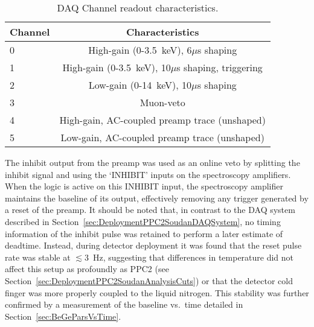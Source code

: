 	\begin{table}
		\centering
		\begin{tabular}{l c}
			\toprule
			Channel & Characteristics \\
			\midrule
			0 & High-gain (0-3.5~keV), 6$\mu$s shaping \\
			1 & High-gain (0-3.5~keV), 10$\mu$s shaping, triggering \\
			2 & Low-gain (0-14~keV), 10$\mu$s shaping \\
			3 & Muon-veto \\
			4 & High-gain, AC-coupled preamp trace (unshaped) \\
			5 & Low-gain, AC-coupled preamp trace (unshaped) \\
			\bottomrule
		\end{tabular}
		\caption[DAQ Channel readout characteristics]
		{DAQ Channel readout characteristics. }
		\label{tab:SoudanDAQTable}
	\end{table}

The inhibit output from the preamp was used as an online veto by splitting the inhibit signal and using the `INHIBIT' inputs on the spectroscopy amplifiers.  When the logic is active on this INHIBIT input, the spectroscopy amplifier maintains the baseline of its output, effectively removing any trigger generated by a reset of the preamp.  It should be noted that, in contrast to the DAQ system described in Section~\ref{sec:DeploymentPPC2SoudanDAQSystem}, no timing information of the inhibit pulse was retained to perform a later estimate of deadtime.  Instead, during detector deployment it was found that the reset pulse rate was stable at $\lesssim$3~Hz, suggesting that differences in temperature did not affect this setup as profoundly as PPC2 (see Section~\ref{sec:DeploymentPPC2SoudanAnalysisCuts}) or that the detector cold finger was more properly coupled to the liquid nitrogen.  This stability was further confirmed by a measurement of the baseline vs.~time detailed in Section~\ref{sec:BeGeParsVsTime}.%

